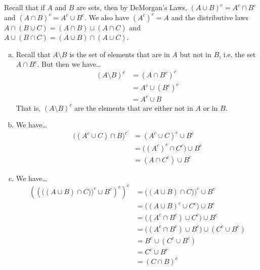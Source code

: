 \documentclass[11pt,letterpaper]{article}
\begin{document}
\sol Recall that if $A$ and $B$ are sets, then by DeMorgan's Laws, $(A \cup B)^c= A^c \cap B^c$ and $(A \cap B)^c= A^c \cup B^c$. We also have $(A^c)^c= A$ and the distributive laws $A \cap (B \cup C)= (A \cap B) \cup (A \cap C)$ and $A \cup (B \cap C)= (A \cup B) \cap (A \cup C)$.
\begin{enumerate}[(a)]
\item Recall that $A \setminus B$ is the set of elements that are in $A$ but not in $B$, i.e. the set $A \cap B^c$. But then we have\dots
	\[
	\begin{aligned}
	(A \setminus B)^c&= (A \cap B^c)^c \\[0.3cm]
	&= A^c \cup (B^c)^c \\[0.3cm]
	&= A^c \cup B
	\end{aligned}
	\]
That is, $(A \setminus B)^c$ are the elements that are either not in $A$ or in $B$. \pspace

\item We have\dots
	\[
	\begin{aligned}
	\big( (A^c \cup C) \cap B \big)^c&= (A^c \cup C)^c \cup B^c \\[0.3cm]
	&= \big( (A^c)^c \cap C^c \big) \cup B^c \\[0.3cm]
	&= (A \cap C^c) \cup B^c
	\end{aligned}
	\] \pspace

\item We have\dots
	\[
	\begin{aligned}
	\left( \left( \big( (A \cup B) \cap C) \big)^c \cup B^c \right)^c \right)^c&= \big( (A \cup B) \cap C) \big)^c \cup B^c \\[0.3cm]
	&= \big( (A \cup B)^c \cup C^c \big) \cup B^c \\[0.3cm]
	&= \big( (A^c \cap B^c) \cup C^c \big) \cup B^c \\[0.3cm]
	&= \big( (A^c \cap B^c) \cup B^c \big) \cup (C^c \cup B^c) \\[0.3cm]
	&= B^c \cup (C^c \cup B^c) \\[0.3cm]
	&= C^c \cup B^c \\[0.3cm]
	&= (C \cap B)^c
	\end{aligned}
	\]
\end{enumerate}



\newpage
\end{document}
